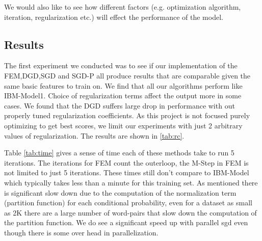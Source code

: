 \documentclass[11pt,letterpaper]{article}
\begin{document}
We would also like to see how different factors (e.g. optimization algorithm, iteration, regularization etc.) will effect the performance of the model.

\subsection{Results}
The first experiment we conducted was to see if our implementation of the FEM,DGD,SGD and SGD-P all produce results that are comparable given the same basic features to train on. We find that all our algorithms perform like IBM-Model1. Choice of regularization terms affect the output more in some cases. We found that the DGD suffers large drop in performance with out properly tuned regularization coefficients. As this project is not focused purely optimizing to get best scores, we limit our experiments with just 2 arbitrary values of regularization. The results are shown in \ref{tab:rc}. 

Table \ref{tab:time} gives a sense of time each of these methods take to run 5 iterations. The iterations for FEM count the outerloop, the M-Step in FEM is not limited to just 5 iterations. These times still don't compare to IBM-Model which typically takes less than a minute for this training set. As mentioned there is significant slow down due to the computation of the normalization term (partition function) for each conditional probability, even for a dataset as small as 2K there are a large number of word-pairs that slow down the computation of the partition function. We do see a significant speed up with parallel sgd even though there is some over head in parallelization.
\end{document}
